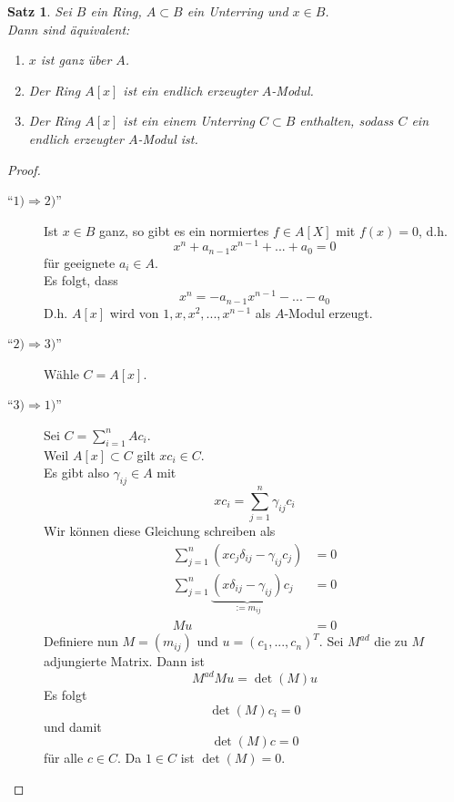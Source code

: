 \documentclass[10pt,a4paper]{article}
\theoremstyle{plain}
\newtheorem{satz}[theorem]{Satz}
\theoremstyle{definition}
\theoremstyle{remark}
\begin{document}
	\begin{satz}
		Sei $B$ ein Ring, $A\subset B$ ein Unterring und $x\in B$.\\
		Dann sind äquivalent:
		\begin{enumerate}
			\item $x$ ist ganz über $A$.
			\item Der Ring $A[x]$ ist ein endlich erzeugter $A$-Modul.
			\item Der Ring $A[x]$ ist ein einem Unterring $C\subset B$ enthalten, sodass $C$ ein endlich erzeugter $A$-Modul ist.
		\end{enumerate}
	\end{satz}
	\begin{proof}
		\begin{description}
			\item[\enquote{$1)\Rightarrow2)$}] Ist $x\in B$ ganz, so gibt es ein normiertes $f\in A[X]$ mit $f(x)=0$, d.h.
			\[x^n+a_{n-1}x^{n-1}+...+a_0=0\]
			für geeignete $a_i\in A$.\\
			Es folgt, dass
			\[x^n=-a_{n-1}x^{n-1}-...-a_0\]
			D.h. $A[x]$ wird von $1,x,x^2,...,x^{n-1}$ als $A$-Modul erzeugt.
			\item[\enquote{$2)\Rightarrow3)$}]Wähle $C=A[x]$.
			\item[\enquote{$3)\Rightarrow1)$}] Sei $C=\sum_{i=1}^{n}Ac_i$.\\
			Weil $A[x]\subset C$ gilt $xc_i\in C$.\\
			Es gibt also $\gamma_{ij}\in A$ mit
			\[xc_{i}=\sum_{j=1}^{n}\gamma_{ij}c_i\]
			Wir können diese Gleichung schreiben als
			\begin{align*}
			\sum_{j=1}^{n}(xc_j\delta_{ij}-\gamma_{ij}c_j)&=0\\
			\sum_{j=1}^{n}\underbrace{(x\delta_{ij}-\gamma_{ij})}_{:=m_{ij}}c_j&=0\\
			Mu&=0
			\end{align*}
			Definiere nun $M=(m_{ij})$ und $u=(c_1,...,c_n)^T$.  Sei $M^{ad}$ die zu $M$ adjungierte Matrix. Dann ist
			\[M^{ad}Mu=\det(M)u\]
			Es folgt
			\[\det(M)c_i=0\]
			und damit
			\[\det(M)c=0\]
			für alle $c\in C$. Da $1\in C$ ist $\det(M)=0$.
		\end{description}
	\end{proof}
\end{document}
